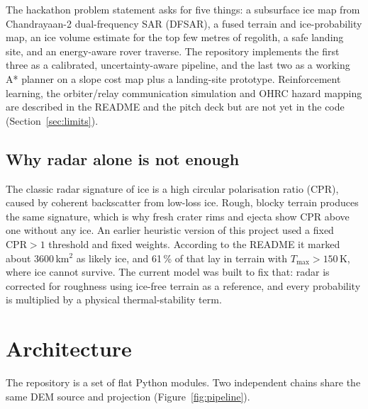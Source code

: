\documentclass[11pt,a4paper]{article}
\begin{document}
The hackathon problem statement asks for five things: a subsurface ice map from Chandrayaan-2
dual-frequency SAR (DFSAR), a fused terrain and ice-probability map, an ice volume estimate for
the top few metres of regolith, a safe landing site, and an energy-aware rover traverse. The
repository implements the first three as a calibrated, uncertainty-aware pipeline, and the last
two as a working A* planner on a slope cost map plus a landing-site prototype. Reinforcement
learning, the orbiter/relay communication simulation and OHRC hazard mapping are described in
the README and the pitch deck but are not yet in the code (Section~\ref{sec:limits}).

\subsection{Why radar alone is not enough}
The classic radar signature of ice is a high circular polarisation ratio (CPR), caused by
coherent backscatter from low-loss ice. Rough, blocky terrain produces the same signature, which
is why fresh crater rims and ejecta show CPR above one without any ice. An earlier heuristic
version of this project used a fixed \(\mathrm{CPR}>1\) threshold and fixed weights. According to
the README it marked about 3600\,km$^2$ as likely ice, and 61\,\% of that lay in terrain with
\(T_{\max}>150\)\,K, where ice cannot survive. The current model was built to fix that: radar is
corrected for roughness using ice-free terrain as a reference, and every probability is
multiplied by a physical thermal-stability term.

\section{Architecture}

The repository is a set of flat Python modules. Two independent chains share the same DEM
source and projection (Figure~\ref{fig:pipeline}).
\end{document}
